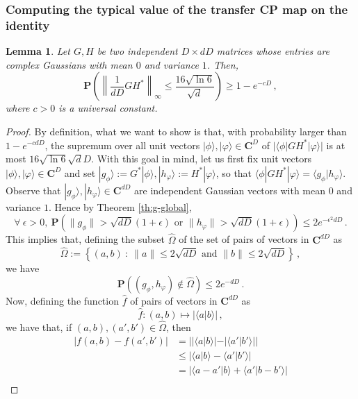 \documentclass{amsart}
\newtheorem{lemma}[theorem]{Lemma}
\newcommand{\C}{\mathbf{C}}
\renewcommand{\P}{\mathbf{P}}
\renewcommand{\leq}{\leqslant}
\renewcommand{\geq}{\geqslant}
\newcommand{\st}{\  : \ }
\newcommand{\braket}[2]{\langle #1 | #2\rangle}
\newcommand{\bra}[1]{\langle #1 |}
\newcommand{\ket}[1]{| #1 \rangle}
\begin{document}
\subsubsection{Computing the typical value of the transfer CP map on the identity} \hfill\par\smallskip

\begin{lemma} \label{lem:GH*}
    Let $G,H$ be two independent $D\times dD$ matrices whose entries are complex Gaussians with mean $0$ and variance $1$. Then,
    \[ \P\left( \left\|\frac{1}{dD}GH^*\right\|_\infty \leq \frac{16\sqrt{\ln 6}}{\sqrt{d}} \right) \geq 1-e^{-cD} \, , \]
    where $c>0$ is a universal constant.
\end{lemma}

\begin{proof}
    By definition, what we want to show is that, with probability larger than $1-e^{-cdD}$, the supremum over all unit vectors $\ket{\phi},\ket{\varphi}\in\C^D$ of $|\bra{\phi}GH^*\ket{\varphi}|$ is at most $16\sqrt{\ln 6}\sqrt{d}D$. With this goal in mind, let us first fix unit vectors $\ket{\phi},\ket{\varphi}\in\C^D$ and set $\ket{g_\phi}:=G^*\ket{\phi},\ket{h_\varphi}:=H^*\ket{\varphi}$, so that $\bra{\phi}GH^*\ket{\varphi}=\braket{g_\phi}{h_\varphi}$. Observe that $\ket{g_\phi},\ket{h_\varphi}\in\C^{dD}$ are independent Gaussian vectors with mean $0$ and variance $1$. Hence by Theorem \ref{th:g-global},
    \[ \forall\ \epsilon>0,\ \P\left( \|g_\phi\| > \sqrt{dD}(1+\epsilon) \text{ or } \|h_\varphi\| > \sqrt{dD}(1+\epsilon) \right) \leq 2e^{-\epsilon^2dD} \, . \]
    This implies that, defining the subset $\hat{\Omega}$ of the set of pairs of vectors in $\C^{dD}$ as
    \[ \hat{\Omega}:=\left\{ (a,b) \st \|a\| \leq 2\sqrt{dD} \text{ and } \|b\| \leq 2\sqrt{dD} \right\} \, , \]
    we have
    \[ \P\left( (g_\phi,h_\varphi)\notin\hat{\Omega} \right) \leq 2e^{-dD} \, . \]
    Now, defining the function $\hat{f}$ of pairs of vectors in $\C^{dD}$ as
    \[ \hat{f}:(a,b)\mapsto |\braket{a}{b}| \, , \]
    we have that, if $(a,b),(a',b')\in\hat{\Omega}$, then
    \begin{align*}
        \left| f(a,b)-f(a',b') \right| & = \left| |\braket{a}{b}| - |\braket{a'}{b'}| \right|                 \\
                                       & \leq \left| \braket{a}{b} - \braket{a'}{b'} \right|                  \\
                                       & = \left| \braket{a-a'}{b} + \braket{a'}{b-b'} \right|                \\

\end{align*}
\end{proof}
\end{document}

